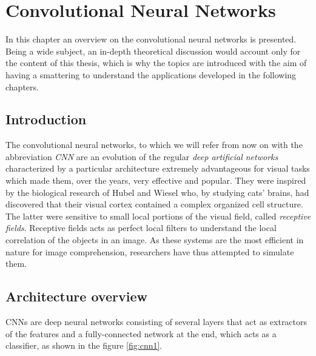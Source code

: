 
\chapter{Convolutional Neural Networks} %
\label{Chapter3}
\def \teoria {Figures/teoria}
\def \path	 {Figures/C3}
In this chapter an overview on the convolutional neural networks is presented. Being a wide subject, an in-depth theoretical discussion would account only for the content of this thesis, which is why the topics are introduced with the aim of having a smattering to understand the applications developed in the following chapters. 

\section{Introduction}

The convolutional neural networks, to which we will refer from now on with the abbreviation \emph{CNN} are an evolution of the regular \emph{deep artificial networks} characterized by a particular architecture extremely advantageous for visual tasks which made them, over the years, very effective and popular. They were inspired by the biological research of Hubel and Wiesel who, by studying cats' brains, had discovered that their visual cortex contained a complex organized cell structure. The latter were sensitive to small local portions of the visual field, called \emph{receptive fields}. Receptive fields acts as perfect local filters to understand the local correlation of the objects in an image. As these systems are the most efficient in nature for image comprehension, researchers have thus attempted to simulate them. 


\section{Architecture overview}
CNNs are deep neural networks consisting of several layers that act as extractors of the features and a fully-connected network at the end, which acts as a classifier, as shown in the figure \ref{fig:cnn1}. 

